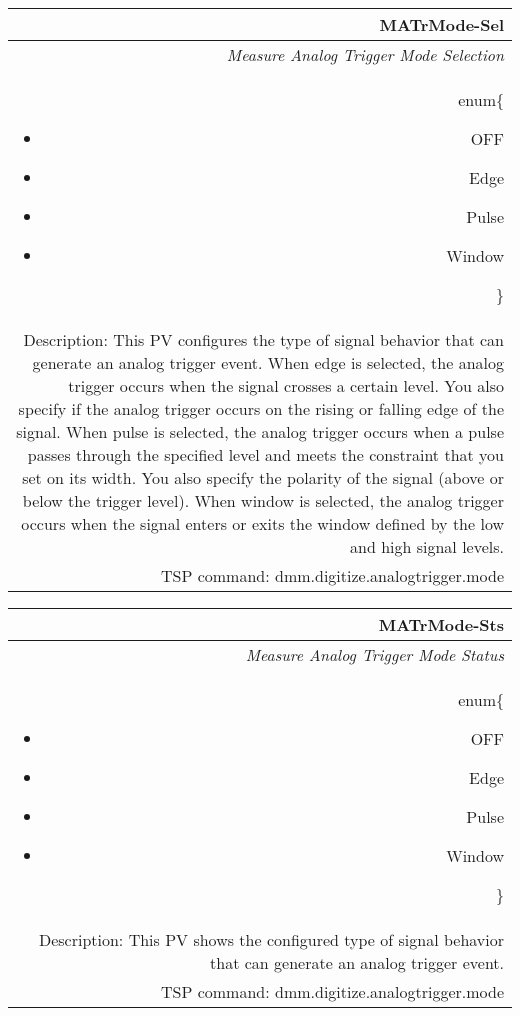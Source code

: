 \documentclass[openany]{article}
\begin{document}
		\begin{tabular}{N}
			\hline
			\bfseries MATrMode-Sel\label{pv:matrmode-sel} \\ \hline
			\emph{Measure Analog Trigger Mode Selection} \\
			enum\{\begin{itemize}[noitemsep]
				\small
				\item[] OFF
				\item[] Edge
				\item[] Pulse
				\item[] Window
			\end{itemize}\} \\
			Description: This PV configures the type of signal behavior that can generate an analog trigger event. When edge is selected, the analog trigger occurs when the signal crosses a certain level. You also specify if the analog trigger occurs on the rising or falling edge of the signal. When pulse is selected, the analog trigger occurs when a pulse passes through the specified level and meets the constraint that you set on its width. You also specify the polarity of the signal (above or below the trigger level). When window is selected, the analog trigger occurs when the signal enters or exits the window defined by the low and high signal levels. \\
			TSP command: dmm.digitize.analogtrigger.mode
		\end{tabular}

		\begin{tabular}{N}
			\hline
			\bfseries MATrMode-Sts\label{pv:matrmode-sts} \\ \hline
			\emph{Measure Analog Trigger Mode Status} \\
			enum\{\begin{itemize}[noitemsep]
				\small
				\item[] OFF
				\item[] Edge
				\item[] Pulse
				\item[] Window
			\end{itemize}\} \\
			Description: This PV shows the configured type of signal behavior that can generate an analog trigger event. \\
			TSP command: dmm.digitize.analogtrigger.mode
		\end{tabular}
\end{document}
